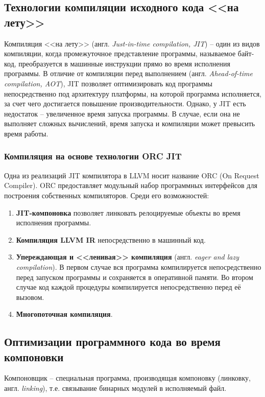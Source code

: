 \subsection{Технологии компиляции исходного кода <<на лету>>}
Компиляция <<на лету>> (англ. \textit{Just-in-time compilation, JIT}) --
один из видов компиляции, когда промежуточное представление программы, 
называемое байт-код, преобразуется в машинные инструкции прямо во время
исполнения программы. В отличие от компиляции перед выполнением (англ. 
\textit{Ahead-of-time compilation, AOT}), JIT позволяет оптимизировать код
программы непосредственно под архитектуру платформы, на которой программа
исполняется, за счет чего достигается повышение производительности. Однако, у
JIT есть недостаток -- увеличенное время запуска программы. В случае, если она
не выполняет сложных вычислений, время запуска и компиляции может превысить 
время работы.
\subsubsection{Компиляция на основе технологии ORC JIT}
Одна из реализаций JIT компилятора в LLVM носит название ORC (On Request 
Compiler). ORC предоставляет модульный набор программных интерфейсов для 
построения собственных компиляторов. Среди его возможностей:
\begin{enumerate}
\item \textbf{JIT-компоновка} позволяет линковать релоцируемые объекты во время
исполнения программы.
\item \textbf{Компиляция LLVM IR} непосредственно в машинный код.
\item \textbf{Упереждающая и <<ленивая>> компиляция} (англ. \textit{eager and
lazy compilation}). В первом случае вся программа компилируется непосредственно
перед запуском программы и сохраняется в оперативной памяти. Во втором случае
код каждой процедуры компилируется непосредственно перед её вызовом.
\item \textbf{Многопоточная компиляция}.
\end{enumerate}

\subsection{Оптимизации программного кода во время компоновки}
Компоновщик -- специальная программа, производящая компоновку (линковку, англ.
\textit{linking}), т.е. связывание бинарных модулей в исполняемый файл.

